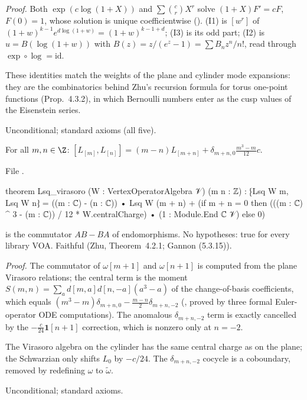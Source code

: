 \noindent\emph{Proof.} Both $\exp(c\log(1+X))$ and $\sum\binom crX^r$ solve $(1+X)F' = cF$, $F(0) = 1$, whose solution is
unique coefficientwise (). (I1) is $[w^r]$ of $(1+w)^{k-1}e^{d\log(1+w)} = (1+w)^{k-1+d}$; (I3) is its
odd part; (I2) is $u = B(\log(1+w))$ with $B(z) = z/(e^z-1) = \sum B_nz^n/n!$, read through $\exp\circ\log = \mathrm{id}$.
\begin{physics}
These identities match the weights of the plane and cylinder mode expansions: they are the combinatorics behind Zhu's
recursion formula for torus one-point functions (Prop.~4.3.2), in which Bernoulli numbers enter as the cusp values of the
Eisenstein series.
\end{physics}
\begin{status}
Unconditional; standard axioms (all five).
\end{status}

\begin{theorem}\label{l14:thm:Lsq}
For all $m,n\in\Z$: $[L_{[m]},L_{[n]}] = (m-n)L_{[m+n]} + \delta_{m+n,0}\frac{m^3-m}{12}c$.
\end{theorem}
\noindent File .
\begin{leancode}
theorem Lsq_virasoro (W : VertexOperatorAlgebra 𝒱) (m n : ℤ) :
    ⁅Lsq W m, Lsq W n⁆
      = ((m : ℂ) - (n : ℂ)) • Lsq W (m + n)
        + (if m + n = 0 then (((m : ℂ) ^ 3 - (m : ℂ)) / 12 * W.centralCharge)
             • (1 : Module.End ℂ 𝒱) else 0)
\end{leancode}
\begin{dictionary}
 is the commutator $AB - BA$ of endomorphisms. No hypotheses: true for every library VOA. Faithful (Zhu,
Theorem~4.2.1; Gannon (5.3.15)).
\end{dictionary}
\noindent\emph{Proof.} The commutator of $\omega[m+1]$ and $\omega[n+1]$ is computed from the plane Virasoro relations; the
central term is the moment $S(m,n) = \sum_ad[m,a]d[n,-a](a^3-a)$ of the change-of-basis coefficients, which equals
$(m^3-m)\delta_{m+n,0} - \frac{m-n}2\delta_{m+n,-2}$ (, proved by three formal Euler-operator
ODE computations). The anomalous $\delta_{m+n,-2}$ term is exactly cancelled by the $-\frac c{24}\mathbf 1[n+1]$ correction,
which is nonzero only at $n=-2$.
\begin{physics}
The Virasoro algebra on the cylinder has the same central charge as on the plane; the Schwarzian only shifts $L_0$ by $-c/24$.
The $\delta_{m+n,-2}$ cocycle is a coboundary, removed by redefining $\omega$ to $\tilde\omega$.
\end{physics}
\begin{status}
Unconditional; standard axioms.
\end{status}

